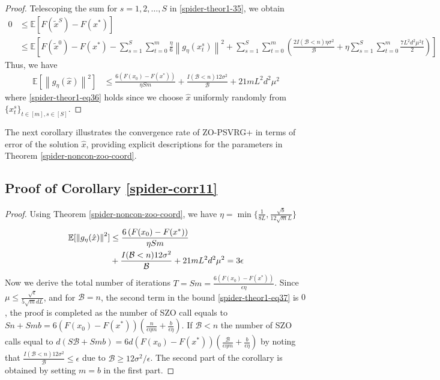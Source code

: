 \documentclass[iicol,sn-basic]{sn-jnl}
\theoremstyle{thmstyleone}%
\theoremstyle{thmstyletwo}%
\theoremstyle{thmstylethree}%
\newcommand*{\E}{\mathbb{E}}
\newcommand{\norm}[1]{\left\lVert#1\right\rVert}
\begin{document}
\begin{proof}
 Telescoping the sum for $s = 1, 2, \ldots, S$ in \eqref{spider-theor1-35}, we obtain
 \begin{equation*}
\begin{split} 
0 &\leq \E[F(\tilde{x}^S) - F({x}^*)] \\
&\leq \E\left[F(\tilde{x}^{0}) - F({x}^*) - \sum_{s=1}^S\sum_{t=0}^m\frac{\eta}{6}\norm{g_{\eta}(x_{t}^s)}^2 + \sum_{s=1}^S\sum_{t=0}^m(\frac{2I(\mathcal{B} < n)\eta \sigma ^2}{\mathcal{B}}+ \eta\sum_{s=1}^S\sum_{t=0}^m\frac{7 L^2 d^2 \mu^2 t}{2})\right]
 \end{split}
 \end{equation*}
 Thus, we have
  \begin{align}
\E[\norm{g_{\eta}(\hat{x})}^2] & \leq \frac{6\left(F(x_0) - F({x}^*)\right)}{\eta Sm} + \frac{I(\mathcal{B} < n)12\sigma ^2}{\mathcal{B}}+21{m L^2 d^2 \mu^2}\label{spider-theor1-eq36}
 \end{align}
 where \eqref{spider-theor1-eq36} holds since we choose  $\hat{x}$ uniformly randomly from $\{x_{t}^s\}_{t\in [m], s\in [S]}$. 
\end{proof} 

The next corollary illustrates the convergence rate of ZO-PSVRG+ in terms of error of the solution $\hat{x}$, providing explicit descriptions for the parameters in Theorem \ref{spider-noncon-zoo-coord}.

\noindent\subsection{Proof of Corollary \ref{spider-corr11}}
\begin{proof}
Using Theorem \ref{spider-noncon-zoo-coord}, we have $\eta = \min\{\frac{1}{8L}, \frac{\sqrt{b}}{12 \sqrt{m}L}\}$
\begin{align}
\E[\norm{g_{\eta}(\hat{x})}^2] & \leq \frac{6\left(F(x_0) - F({x}^*)\right)}{\eta Sm}\notag\\
& + \frac{I(\mathcal{B} < n)12 \sigma ^2}{\mathcal{B}}+21{mL^2 d^2 \mu^2} = 3\epsilon\label{spider-theor1-eq37}
 \end{align} 
 Now we derive the total number of iterations   $T = Sm = \frac{6\left(F(x_0) - F({x}^*)\right)}{\epsilon\eta}$. Since $\mu \leq \frac{\sqrt{\epsilon}}{5{\sqrt{m}dL}}$, and for $\mathcal{B} = n$, the second term in the bound \eqref{spider-theor1-eq37} is $0$, the proof is completed as the number of SZO call equals to $Sn+Smb = 6 \left(F(x_0) - F({x}^*)\right) (\frac{n}{\epsilon\eta m}+\frac{b}{\epsilon\eta})$. If  $\mathcal{B} < n$ the number of SZO calls equal to  $d(S\mathcal{B}+Smb) = 6d \left(F(x_0) - F({x}^*)\right) (\frac{\mathcal{\mathcal{B}}}{\epsilon\eta m}+\frac{b}{\epsilon\eta})$ by noting that $\frac{I(\mathcal{B} < n)12\sigma^2}{\mathcal{B}} \leq \epsilon$ due to $\mathcal{B} \geq 12\sigma^2 /\epsilon$. The second part of the corollary is obtained by setting $m = b$ in the first part.
\end{proof}
\end{document}

